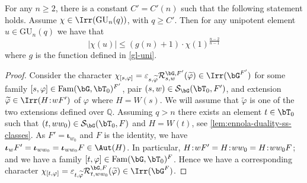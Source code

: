 \documentclass[eqthmnum,nocolour,skinny]{jt-calcs}
\DeclareMathOperator{\Fam}{Fam}
\newcommand{\GU}{\ensuremath{\mathrm{GU}}}
\newcommand\sd{
	\mathchoice{\mkern1.5mu}{\mkern1.5mu}{}{}%
	{:}%
	\mathchoice{\mkern1.5mu}{\mkern1.5mu}{}{}
}
\begin{document}
\begin{prop}\label{gu-uni}
For any $n \geq 2$, there is a constant $C'=C'(n)$ such that the following statement holds.
Assume $\chi \in \Irr(\GU_n(q))$, with $q \geq C'$. Then for any unipotent element $u \in \GU_n(q)$ we have that
\begin{equation*}
|\chi(u)| \leqslant (g(n)+1) \cdot \chi(1)^{\frac{n-2}{n-1}}
\end{equation*}
where $g$ is the function defined in \cref{gl-uni}.
\end{prop}

\begin{proof}
Consider the character $\chi_{[s,\varphi]} = \varepsilon_{s,\widetilde{\varphi}}\mathcal{R}_{s,w}^{\bG,F'}(\widetilde{\varphi}) \in \Irr(\bG^{F'})$ for some family $[s,\varphi] \in \Fam(\bG,\bT_0)^{F'}$, pair $(s,w) \in \mathcal{S}_{\bG}(\bT_0,F')$, and extension $\widetilde{\varphi} \in \Irr(H\sd wF')$ of $\varphi$ where $H = W(s)$. We will assume that $\widetilde{\varphi}$ is one of the two extensions defined over $\mathbb{Q}$. Assuming $q > n$ there exists an element $t \in \bT_0$ such that $(t,ww_0) \in \mathcal{S}_{\bG}(\bT_0,F)$ and $H = W(t)$, see \cref{lem:ennola-duality-ss-classes}. As $F' = \boldsymbol{\iota}_{w_0}$ and $F$ is the identity, we have $\boldsymbol{\iota}_wF' = \boldsymbol{\iota}_{ww_0} = \boldsymbol{\iota}_{ww_0}F \in \Aut(H)$. In particular, $H \sd wF' = H \sd ww_0 = H \sd ww_0F$; and we have a family $[t,\varphi] \in \Fam(\bG,\bT_0)^F$. Hence we have a corresponding character $\chi_{[t,\varphi]} = \varepsilon_{t,\widetilde{\varphi}}\mathcal{R}_{t,ww_0}^{\bG,F}(\widetilde{\varphi}) \in \Irr(\bG^F)$.


\end{proof}
\end{document}
